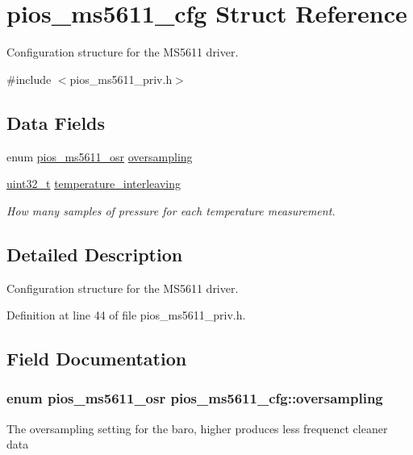 \hypertarget{structpios__ms5611__cfg}{\section{pios\-\_\-ms5611\-\_\-cfg Struct Reference}
\label{structpios__ms5611__cfg}
}


Configuration structure for the M\-S5611 driver.  




{\ttfamily \#include $<$pios\-\_\-ms5611\-\_\-priv.\-h$>$}

\subsection*{Data Fields}
\begin{DoxyCompactItemize}
\item 
enum \hyperlink{group___p_i_o_s___m_s5611_gab2c6484befa4b5993218d392d4db0bd3}{pios\-\_\-ms5611\-\_\-osr} \hyperlink{structpios__ms5611__cfg_a07e19545d4961ed113e3413ad0c4965c}{oversampling}
\item 
\hyperlink{stdint_8h_a435d1572bf3f880d55459d9805097f62}{uint32\-\_\-t} \hyperlink{structpios__ms5611__cfg_a9e5737bd6a7bb20da4ac013fb0726845}{temperature\-\_\-interleaving}
\begin{DoxyCompactList}\small\item\em How many samples of pressure for each temperature measurement. \end{DoxyCompactList}\end{DoxyCompactItemize}


\subsection{Detailed Description}
Configuration structure for the M\-S5611 driver. 

Definition at line 44 of file pios\-\_\-ms5611\-\_\-priv.\-h.



\subsection{Field Documentation}
\hypertarget{structpios__ms5611__cfg_a07e19545d4961ed113e3413ad0c4965c}{
\subsubsection[{oversampling}]{\setlength{\rightskip}{0pt plus 5cm}enum {\bf pios\-\_\-ms5611\-\_\-osr} pios\-\_\-ms5611\-\_\-cfg\-::oversampling}}\label{structpios__ms5611__cfg_a07e19545d4961ed113e3413ad0c4965c}
The oversampling setting for the baro, higher produces less frequenct cleaner data 

